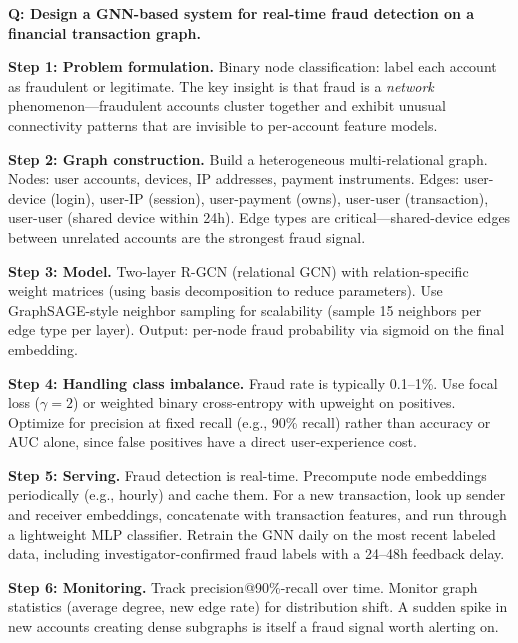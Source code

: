 \begin{interviewq}
\textbf{Q: Design a GNN-based system for real-time fraud detection on a financial transaction graph.}

 \quad {} \quad \badgefreq{\freqmed}

\stronganswer

\textbf{Step 1: Problem formulation.} Binary node classification: label each account as fraudulent or legitimate. The key insight is that fraud is a \textit{network} phenomenon---fraudulent accounts cluster together and exhibit unusual connectivity patterns that are invisible to per-account feature models.

\textbf{Step 2: Graph construction.} Build a heterogeneous multi-relational graph. Nodes: user accounts, devices, IP addresses, payment instruments. Edges: user-device (login), user-IP (session), user-payment (owns), user-user (transaction), user-user (shared device within 24h). Edge types are critical---shared-device edges between unrelated accounts are the strongest fraud signal.

\textbf{Step 3: Model.} Two-layer R-GCN (relational GCN) with relation-specific weight matrices (using basis decomposition to reduce parameters). Use GraphSAGE-style neighbor sampling for scalability (sample 15 neighbors per edge type per layer). Output: per-node fraud probability via sigmoid on the final embedding.

\textbf{Step 4: Handling class imbalance.} Fraud rate is typically 0.1--1\%. Use focal loss ($\gamma = 2$) or weighted binary cross-entropy with upweight on positives. Optimize for precision at fixed recall (e.g., 90\% recall) rather than accuracy or AUC alone, since false positives have a direct user-experience cost.

\textbf{Step 5: Serving.} Fraud detection is real-time. Precompute node embeddings periodically (e.g., hourly) and cache them. For a new transaction, look up sender and receiver embeddings, concatenate with transaction features, and run through a lightweight MLP classifier. Retrain the GNN daily on the most recent labeled data, including investigator-confirmed fraud labels with a 24--48h feedback delay.

\textbf{Step 6: Monitoring.} Track precision@90\%-recall over time. Monitor graph statistics (average degree, new edge rate) for distribution shift. A sudden spike in new accounts creating dense subgraphs is itself a fraud signal worth alerting on.


\end{interviewq}
